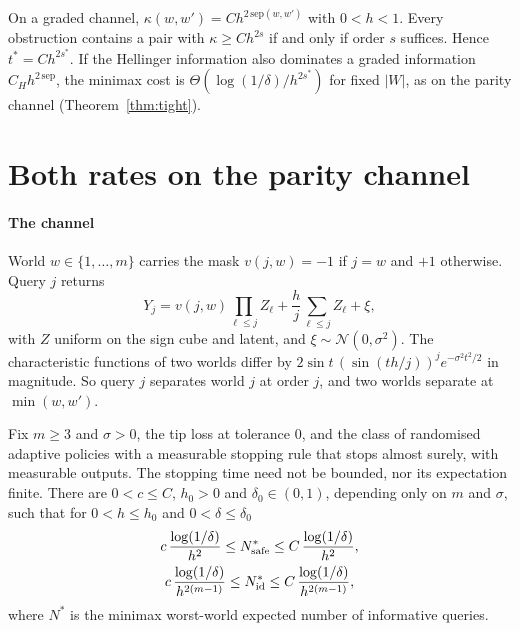 \begin{theorem}
\label{thm:order}
On a graded channel, $\kappa(w,w')=Ch^{2\,\mathrm{sep}(w,w')}$ with $0<h<1$. Every obstruction
contains a pair with $\kappa\ge Ch^{2s}$ if and only if order $s$ suffices. Hence
$t^{*}=Ch^{2s^{*}}$. If the Hellinger information also dominates a graded information
$C_{H}h^{2\,\mathrm{sep}}$, the minimax cost is $\Theta(\log(1/\delta)/h^{2s^{*}})$ for fixed $|W|$, as on
the parity channel (Theorem~\ref{thm:tight}).
\end{theorem}


\section{Both rates on the parity channel}
\label{sec:parity}

\paragraph{The channel} World $w\in\{1,\dots,m\}$ carries the mask $v(j,w)=-1$ if $j=w$ and $+1$
otherwise. Query $j$ returns
\[
Y_{j}=v(j,w)\prod_{\ell\le j}Z_{\ell}+\frac hj\sum_{\ell\le j}Z_{\ell}+\xi,
\]
with $Z$ uniform on the sign cube and latent, and $\xi\sim\mathcal N(0,\sigma^{2})$. The
characteristic functions of two worlds differ by $2\sin t\,(\sin(th/j))^{j}e^{-\sigma^{2}t^{2}/2}$
in magnitude. So query $j$ separates world $j$ at order $j$, and two worlds separate at
$\min(w,w')$.


\begin{theorem}
\label{thm:endpoint}
Fix $m\ge3$ and $\sigma>0$, the tip loss at tolerance $0$, and the class of randomised adaptive
policies with a measurable stopping rule that stops almost surely, with measurable outputs. The
stopping time need not be bounded, nor its expectation finite. There are $0<c\le C$, $h_{0}>0$
and $\delta_{0}\in(0,1)$, depending only on $m$ and $\sigma$, such that for $0<h\le h_{0}$ and
$0<\delta\le\delta_{0}$
\begin{gather*}
c\,\frac{\log(1/\delta)}{h^{2}}\le N^{*}_{\rm safe}\le C\,\frac{\log(1/\delta)}{h^{2}},\\
c\,\frac{\log(1/\delta)}{h^{2(m-1)}}\le N^{*}_{\rm id}\le C\,\frac{\log(1/\delta)}{h^{2(m-1)}},
\end{gather*}
where $N^{*}$ is the minimax worst-world expected number of informative queries.
\end{theorem}

